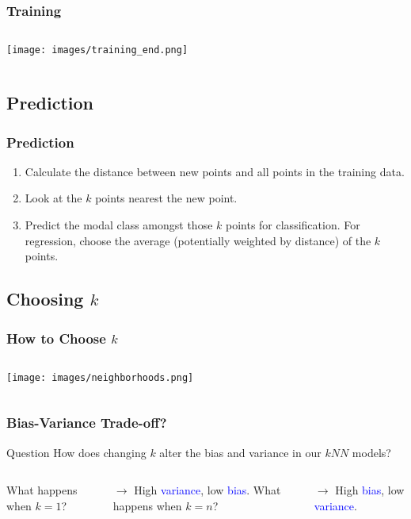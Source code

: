 \documentclass{beamer}
\begin{document}
\begin{frame}
  \frametitle{Training}
  \begin{columns}
    \texttt{[image: images/training\_end.png]}
  \end{columns}
\end{frame}

\subsection{Prediction}
\begin{frame}
  \frametitle{Prediction}
  \begin{enumerate}
    \item Calculate the distance between new points and all points in the training data. \vspace{2mm} \pause
    \item Look at the $k$ points nearest the new point. \vspace{2mm} \pause
    \item Predict the modal class amongst those $k$ points for classification. For regression, choose the average (potentially weighted by distance) of the $k$ points.
  \end{enumerate}
\end{frame}

\subsection{Choosing $k$}
\begin{frame}
  \frametitle{How to Choose $k$}
  \begin{columns}
    \texttt{[image: images/neighborhoods.png]}
  \end{columns}
\end{frame}

\begin{frame}
  \frametitle{Bias-Variance Trade-off?}
  \begin{block}{Question}
    How does changing $k$ alter the bias and variance in our $kNN$ models?
  \end{block} \vspace{8mm} \pause
  \begin{columns}
    \centering
    What happens when $k=1$? \vspace{4mm} \pause

    $\rightarrow$ {\large High \textcolor{blue}{variance}, low \textcolor{blue}{bias}.} \pause
    \centering
    What happens when $k=n$? \vspace{4mm} \pause

    $\rightarrow$ {\large High \textcolor{blue}{bias}, low \textcolor{blue}{variance}.}
  \end{columns}
\end{frame}
\end{document}
